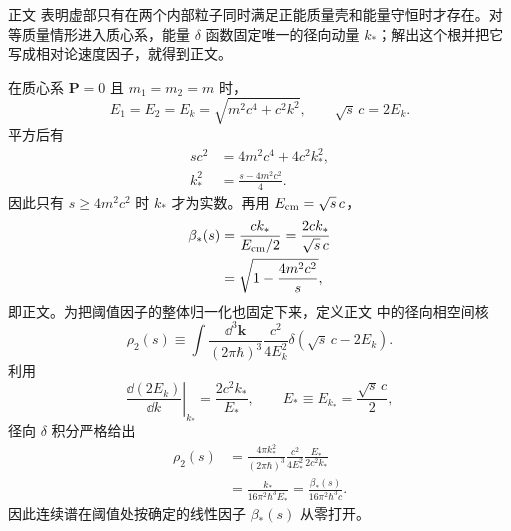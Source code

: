 

\begin{derivation}[二体阈值附近的相空间因子]

正文 表明虚部只有在两个内部粒子同时满足正能质量壳和能量守恒时才存在。对等质量情形进入质心系，能量 $\delta$ 函数固定唯一的径向动量 $k_*$；解出这个根并把它写成相对论速度因子，就得到正文。

在质心系 $\mathbf P=0$ 且 $m_1=m_2=m$ 时，
\begin{equation*}
 E_1=E_2=E_k=\sqrt{m^2c^4+c^2k^2},
 \qquad
 \sqrt{s}\,c=2E_k.
\end{equation*}
平方后有
\begin{align*}
 sc^2
 &=4m^2c^4+4c^2k_*^2,\\
 k_*^2
 &=\frac{s-4m^2c^2}{4}.
\end{align*}
因此只有 $s\ge4m^2c^2$ 时 $k_*$ 才为实数。再用 $E_{\rm cm}=\sqrt{s}\,c$，
\begin{align*}
 \beta_*(s)
 &=\frac{ck_*}{E_{\rm cm}/2}
 =\frac{2ck_*}{\sqrt{s}\,c}\\
 &=\sqrt{1-\frac{4m^2c^2}{s}},
\end{align*}
即正文。为把阈值因子的整体归一化也固定下来，定义正文 中的径向相空间核
\begin{equation*}
 \rho_2(s)
 \equiv
 \int\frac{\dd^3\mathbf k}{(2\pi\hbar)^3}
 \frac{c^2}{4E_k^2}
 \delta\!\left(\sqrt{s}\,c-2E_k\right).
\end{equation*}
利用
\begin{equation*}
 \left.\frac{\dd(2E_k)}{\dd k}\right|_{k_*}
 =\frac{2c^2k_*}{E_*},
 \qquad E_*\equiv E_{k_*}=\frac{\sqrt{s}\,c}{2},
\end{equation*}
径向 $\delta$ 积分严格给出
\begin{align*}
 \rho_2(s)
 &=\frac{4\pi k_*^2}{(2\pi\hbar)^3}
 \frac{c^2}{4E_*^2}
 \frac{E_*}{2c^2k_*}\\
 &=\frac{k_*}{16\pi^2\hbar^3E_*}
 =\frac{\beta_*(s)}{16\pi^2\hbar^3c}.
\end{align*}
因此连续谱在阈值处按确定的线性因子 $\beta_*(s)$ 从零打开。
\end{derivation}













